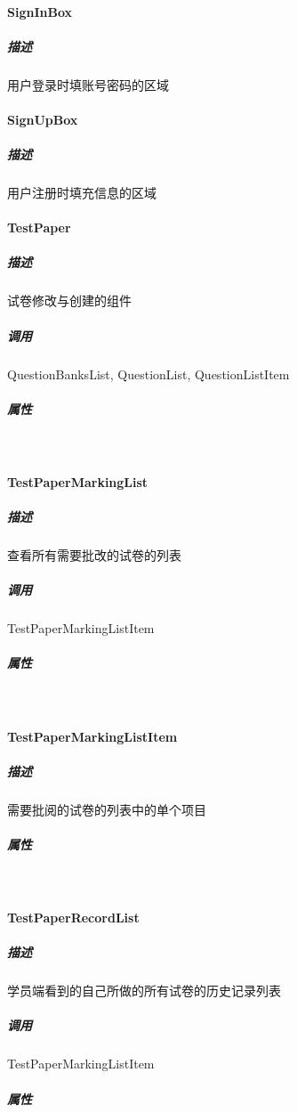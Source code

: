 \documentclass{article}
\begin{document}
        \paragraph{SignInBox}
            \subparagraph{描述}
                用户登录时填账号密码的区域
          
        \paragraph{SignUpBox}
            \subparagraph{描述}
                用户注册时填充信息的区域
        
        \paragraph{TestPaper}
            \subparagraph{描述}
                试卷修改与创建的组件
            \subparagraph{调用}
                QuestionBanksList, QuestionList, QuestionListItem
            \subparagraph{属性}\ \par
                
        \paragraph{TestPaperMarkingList}
            \subparagraph{描述}
                查看所有需要批改的试卷的列表
            \subparagraph{调用}
                TestPaperMarkingListItem
            \subparagraph{属性}\ \par
                
        \paragraph{TestPaperMarkingListItem}
            \subparagraph{描述}
                需要批阅的试卷的列表中的单个项目
            \subparagraph{属性}\ \par
                
        \paragraph{TestPaperRecordList}
            \subparagraph{描述}
                学员端看到的自己所做的所有试卷的历史记录列表
            \subparagraph{调用}
                TestPaperMarkingListItem
            \subparagraph{属性}\ \par
                
\end{document}
